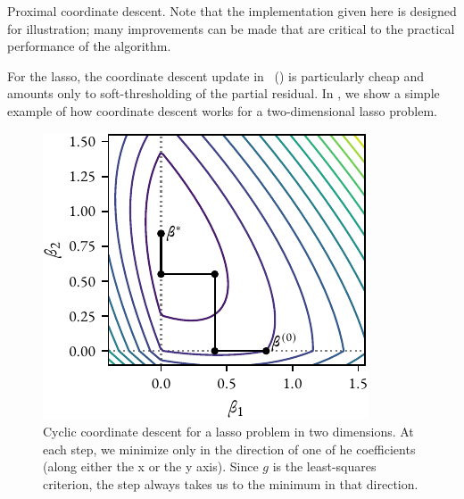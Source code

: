 %

\begin{algorithm}[hbtp]
  \caption{Proximal coordinate descent. Note that the implementation given here is designed for illustration; many improvements can be made that are critical to the practical performance of the algorithm.}
  \label{alg:pcd}
  \KwIn{$\vec{\beta} \gets \zeros$}{}
\end{algorithm}

For the lasso, the coordinate descent update in ~() is particularly cheap and amounts only to soft-thresholding of the partial residual. In , we show a simple example of how coordinate descent works for a two-dimensional lasso problem.

\begin{figure}[htpb]
  \centering
  \includegraphics[]{figures/cd.pdf}
  \caption{%
    Cyclic coordinate descent for a lasso problem in two dimensions. At each step, we minimize only in the direction of one of he coefficients (along either the x or the y axis). Since \(g\) is the least-squares criterion, the step always takes us to the minimum in that direction.
  }
  \label{fig:pcd-lasso}
\end{figure}


